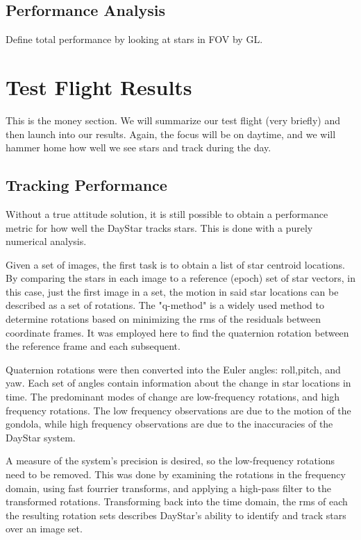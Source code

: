 \documentclass[twocolumn,letterpaper]{IEEEAerospace2012}
\begin{document}
\subsection{Performance Analysis}





Define total performance by looking at stars in FOV by GL.



\section{Test Flight Results}
This is the money section. We will summarize our test flight (very briefly) and then launch into our results. Again, the focus will be on daytime, and we will hammer home how well we see stars and track during the day.

\subsection{Tracking Performance}
Without a true attitude solution, it is still possible to obtain a performance metric for how well the DayStar tracks stars. This is done with a purely numerical analysis.

Given a set of images, the first task is to obtain a list of star centroid locations. By comparing the stars in each image to a reference (epoch) set of star vectors, in this case, just the first image in a set, the motion in said star locations can be described as a set of rotations. The "q-method" is a widely used method to determine rotations based on minimizing the rms of the residuals between coordinate frames. It was employed here to find the quaternion rotation between the reference frame and each subsequent.

Quaternion rotations were then converted into the Euler angles: roll,pitch, and yaw. Each set of angles contain information about the change in star locations in time. The predominant modes of change are low-frequency rotations, and high frequency rotations. The low frequency observations are due to the motion of the gondola, while high frequency observations are due to the inaccuracies of the DayStar system. 

A measure of the system's precision is desired, so the low-frequency rotations need to be removed. This was done by examining the rotations in the frequency domain, using fast fourrier transforms, and applying a high-pass filter to the transformed rotations. Transforming back into the time domain, the rms of each the resulting rotation sets describes DayStar's ability to identify and track stars over an image set. 
\end{document}
